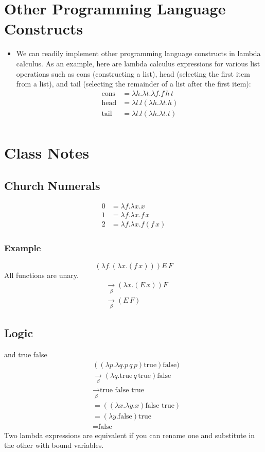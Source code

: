 \documentclass[]{article}
\begin{document}
\section{Other Programming Language Constructs}
\begin{itemize}
\item We can readily implement other programming language constructs in lambda calculus. As an example, here are lambda calculus expressions for various list operations such as cons (constructing a list), head (selecting the first item from a list), and tail (selecting the remainder of a list after the first item):
\begin{align*}
\textrm{cons} &= \lambda h.\lambda t.\lambda f.f\,h\,t\\
\textrm{head} &= \lambda l.l (\lambda h.\lambda t.h)\\
\textrm{tail} &= \lambda l.l (\lambda h.\lambda t.t)\\
\end{align*}
\end{itemize}

\section*{Class Notes}
\subsection*{Church Numerals}
\begin{align*}
0 &= \lambda f.\lambda x.x \\
1 &= \lambda f.\lambda x.f\,x \\
2 &= \lambda f.\lambda x.f(f\,x)
\end{align*}

\subsubsection*{Example}
\[(\lambda f.(\lambda x.(f\,x)))E\,F \]
All functions are unary.
\begin{align*}
&\underset{\beta}{\rightarrow} (\lambda x.(E\,x))F \\
&\underset{\beta}{\rightarrow} (E\,F)
\end{align*}

\subsection*{Logic}
and true false
\begin{align*}
&((\lambda p.\lambda q.p\,q\,p)\textrm{true})\textrm{false}) \\
&\underset{\beta}{\rightarrow}(\lambda q.\textrm{true}\,q\,\textrm{true})\textrm{false} \\
&\underset{\beta}{\rightarrow}\textrm{true false true}\\
&=((\lambda x.\lambda y.x)\textrm{false true}) \\
&=(\lambda y.\textrm{false})\textrm{true} \\
&=\textrm{false}
\end{align*}
Two lambda expressions are equivalent if you can rename one and substitute in the other with bound variables.
\end{document}
